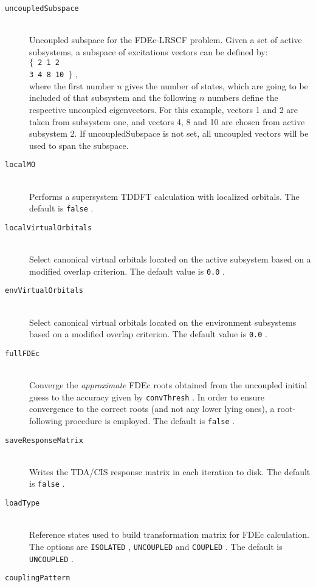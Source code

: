 \documentclass[bibliography=totocnumbered,a4paper,10pt,oneside]{scrbook}
\newcommand{\ttt}[1]{%
  \begingroup\setlength{\fboxsep}{1pt}%
  \colorbox{serenity-green!30}{\texttt{\hspace*{2pt}\vphantom{(g}#1\hspace*{2pt}}}%
  \endgroup
}
\begin{document}
\begin{description}
    \item [\texttt{uncoupledSubspace}]\hfill \\
    Uncoupled subspace for the FDEc-LRSCF problem. Given a set of active subsystems, a subspace of excitations vectors can be defined by: \\  \ttt{$\{$ 2 1 2} \\
    \ttt{3 4 8 10 $\}$}, \\ where the first number $n$ gives the number of states, which are going to be included of that subsystem and the following $n$ numbers define the respective uncoupled eigenvectors. For this example, vectors 1 and 2 are taken from subsystem one, and vectors 4, 8 and 10 are chosen from active subsystem 2. If uncoupledSubspace is not set, all uncoupled vectors will be used to span the subspace.
    \item [\texttt{localMO}]\hfill \\
    Performs a supersystem TDDFT calculation with localized orbitals. The default is \ttt{false}.
    \item [\texttt{localVirtualOrbitals}]\hfill \\
    Select canonical virtual orbitals located on the active subsystem based on a modified overlap criterion. The default value is \ttt{0.0}.
    \item [\texttt{envVirtualOrbitals}]\hfill \\
    Select canonical virtual orbitals located on the environment subsystems based on a modified overlap criterion. The default value is \ttt{0.0}.
    \item [\texttt{fullFDEc}]\hfill \\
    Converge the \emph{approximate} FDEc roots obtained from the uncoupled initial guess to the accuracy given by \ttt{convThresh}. In order to ensure convergence to the correct roots (and not any lower lying ones), a root-following procedure is employed. The default is \ttt{false}.
    \item [\texttt{saveResponseMatrix}]\hfill \\
    Writes the TDA/CIS response matrix in each iteration to disk. The default is \ttt{false}.
    \item [\texttt{loadType}]\hfill \\
    Reference states used to build transformation matrix for FDEc calculation. The options are \ttt{ISOLATED}, \ttt{UNCOUPLED} and \ttt{COUPLED}. The default is \ttt{UNCOUPLED}.
    \item[\texttt{couplingPattern}]\hfill\\

\end{description}
\end{document}
